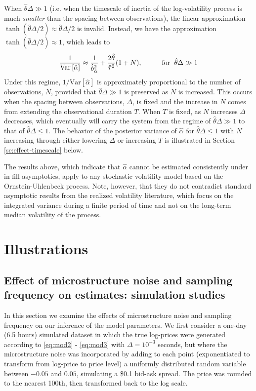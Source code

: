 \documentclass[10pt]{article}
\newcommand{\htheta}{\hat{\theta}}
\newcommand{\halpha}{\hat{\alpha}}
\newcommand{\Var}[1]{\mbox{Var}\left[#1\right]}
\begin{document}
When $\htheta \Delta \gg 1$ (i.e. when the timescale of inertia of the log-volatility process is much \textit{smaller} than the spacing between
observations), the linear approximation
$\tanh(\htheta \Delta/2) \approx \htheta \Delta/2$ is invalid. Instead, we have
the approximation $\tanh(\htheta \Delta/2) \approx 1 $, which leads to
$$ \frac{1}{\Var{\hat{\alpha}} } \approx \frac{1}{\hat{b}^2_{\hat{\alpha}} }+
\frac{2\hat{\theta} }{\hat{\tau}^2} (1 + N), \hspace*{1cm} \mbox{for }
\; \htheta \Delta \gg 1 $$
Under this regime, $1/\Var{\halpha}$ is approximately proportional to the number of observations, $N$, provided that $\htheta \Delta \gg 1$ is preserved as $N$ is increased.  This occurs when the spacing between observations, $\Delta $, is fixed and the increase in $N$ comes from extending the observational duration $T$.  When $T$ is fixed, as $N$ increases $\Delta $ decreases, which eventually will carry the system from the regime of $\htheta \Delta \gg 1$ to that of $\htheta \Delta \le 1$.  The behavior of the posterior variance of $\halpha$ for $\htheta \Delta \leq 1$ with $N$ increasing through either lowering $\Delta$ or increasing $T$ is illustrated in Section \ref{se:effect-timescale} below.

The results above, which indicate that $\halpha$ cannot be estimated consistently under in-fill asymptotics, apply to any stochastic volatility model based on the Ornstein-Uhlenbeck process.  Note, however, that they do not contradict standard asymptotic results from the realized volatility literature, which focus on the integrated variance during a finite period of time and not on the long-term median volatility of the process.

\section{Illustrations}\label{simulation-results}

\subsection{Effect of microstructure noise and sampling frequency on estimates: simulation studies}

In this section we examine the effects of microstructure noise and sampling frequency on our inference of the model parameters. We first consider a one-day (6.5 hours) simulated dataset in which the true log-prices were generated according to \eqref{eq:mod2} - \eqref{eq:mod3} with $\Delta = 10^{-3}$ seconds, but where the microstructure noise was incorporated by adding to each point (exponentiated to transform from log-price to price level) a uniformly distributed random variable between $-0.05$ and $0.05$, simulating a \$0.1 bid-ask spread. The price was rounded to the nearest 100th, then transformed back to the log scale.
\end{document}
